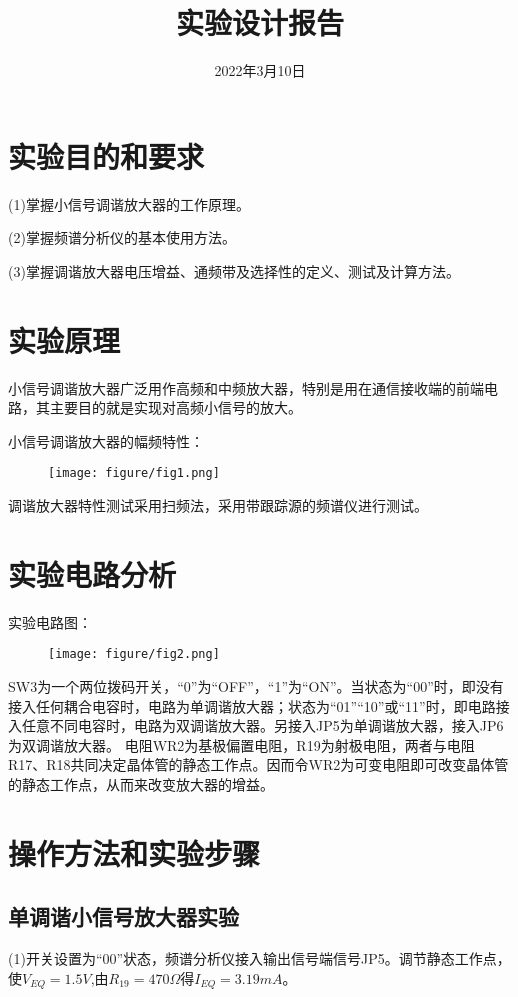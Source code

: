 \documentclass{../source/zjureport}
\title{实验设计报告}
\date{2022年3月10日}
\begin{document}
	\makecover
    \makeheader
    \section{实验目的和要求}
    (1)掌握小信号调谐放大器的工作原理。
    
    (2)掌握频谱分析仪的基本使用方法。
    
    (3)掌握调谐放大器电压增益、通频带及选择性的定义、测试及计算方法。

    \section{实验原理}
    小信号调谐放大器广泛用作高频和中频放大器，特别是用在通信接收端的前端电路，其主要目的就是实现对高频小信号的放大。
    
    小信号调谐放大器的幅频特性：
    \begin{figure}[H]
    	\centering
    	\texttt{[image: figure/fig1.png]}
    \end{figure}
    
    调谐放大器特性测试采用扫频法，采用带跟踪源的频谱仪进行测试。
    
    \section{实验电路分析}
    实验电路图：
    
    \begin{figure}[H]
    	\centering
    	\texttt{[image: figure/fig2.png]}
    \end{figure}
	
	SW3为一个两位拨码开关，“0”为“OFF”，“1”为“ON”。当状态为“00”时，即没有接入任何耦合电容时，电路为单调谐放大器；状态为“01”“10”或“11”时，即电路接入任意不同电容时，电路为双调谐放大器。另接入JP5为单调谐放大器，接入JP6为双调谐放大器。
	电阻WR2为基极偏置电阻，R19为射极电阻，两者与电阻R17、R18共同决定晶体管的静态工作点。因而令WR2为可变电阻即可改变晶体管的静态工作点，从而来改变放大器的增益。
	
	\section{操作方法和实验步骤}
	\subsection{单调谐小信号放大器实验}
	(1)开关设置为“00”状态，频谱分析仪接入输出信号端信号JP5。调节静态工作点，使$V_{EQ} = 1.5V$,由$R_{19} = 470\Omega$得$I_{EQ} = 3.19 mA$。
	
\end{document}
